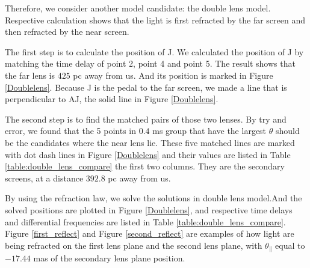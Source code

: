 \documentclass[useAMS,usenatbib]{mn2e}
\begin{document}
Therefore, we consider another model candidate: the double lens model. Respective calculation shows that the light is first refracted by the far screen and then refracted by the near screen. 

The first step is to calculate the position of J. We calculated the position of J by matching the time delay of point 2, point 4 and point 5. The result shows that the far lens is $425$ pc away from us. And its position is marked in Figure \ref{Doublelens}. Because J is the pedal to the far screen, we made a line that is perpendicular to AJ, the solid line in Figure \ref{Doublelens}.

The second step is to find the matched pairs of those two lenses. By try and error, we found that the 5 points in $0.4$ ms group that have the largest $\theta$ should be the candidates where the near lens lie.  These five matched lines are marked with dot dash lines in Figure \ref{Doublelens} and their values are listed in Table \ref{table:double_lens_compare} the first two columns. They are the secondary screens, at a distance $392.8$ pc away from us. 

By using the refraction law, we solve the solutions in double lens model.And the solved positions are plotted in Figure \ref{Doublelens}, and respective time delays and differential frequencies are listed in Table \ref{table:double_lens_compare}.  Figure \ref{first_reflect} and Figure \ref{second_reflect} are examples of how light are being refracted on the first lens plane and the second lens plane, with $\theta_{\parallel}$ equal to $-17.44$ mas of the secondary lens plane position.



\end{document}
